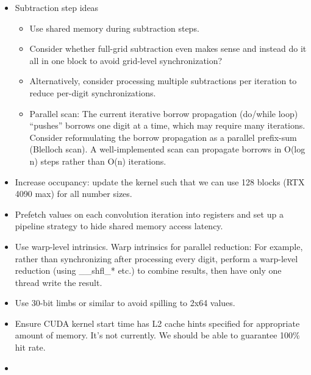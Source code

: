 \documentclass[12pt]{article}
\begin{document}
\begin{itemize}
\item Subtraction step ideas
    \begin{itemize}
    \item Use shared memory during subtraction steps.
    \item Consider whether full-grid subtraction even makes sense and instead do it all in one block to avoid grid-level synchronization?
    \item Alternatively, consider processing multiple subtractions per iteration to reduce per-digit synchronizations.
    \item Parallel scan:  The current iterative borrow propagation (do/while loop) ``pushes'' borrows one digit at a time, which may require many iterations. Consider reformulating the borrow propagation as a parallel prefix-sum (Blelloch scan). A well-implemented scan can propagate borrows in O(log n) steps rather than O(n) iterations.
\end{itemize}
\item Increase occupancy: update the kernel such that we can use 128 blocks (RTX 4090 max) for all number sizes.
\item Prefetch values on each convolution iteration into registers and set up a pipeline strategy to hide shared memory access latency.
\item Use warp-level intrinsics.  Warp intrinsics for parallel reduction: For example, rather than synchronizing after processing every digit, perform a warp-level reduction (using __shfl_* etc.) to combine results, then have only one thread write the result.
\item Use 30-bit limbs or similar to avoid spilling to 2x64 values.
\item Ensure CUDA kernel start time has L2 cache hints specified for appropriate amount of memory.  It's not currently.  We should be able to guarantee 100\% hit rate.
\item 
\end{itemize}
\end{document}
